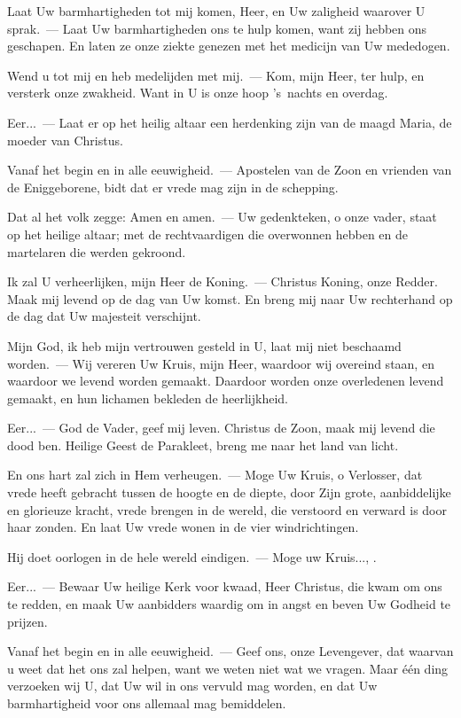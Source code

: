 \documentclass[12pt,twoside,a5paper]{article}
\begin{document}
\begin{halfparskip}
   Laat Uw barmhartigheden tot mij komen, Heer, en Uw zaligheid waarover U sprak.~--- Laat Uw barmhartigheden ons te hulp komen, want zij hebben ons geschapen. En laten ze onze ziekte genezen met het medicijn van Uw mededogen.

  Wend u tot mij en heb medelijden met mij.~--- Kom, mijn Heer, ter hulp, en versterk onze zwakheid. Want in U is onze hoop 's~nachts en overdag.

  Eer...~--- Laat er op het heilig altaar een herdenking zijn van de maagd Maria, de moeder van Christus.

  Vanaf het begin en in alle eeuwigheid.~--- Apostelen van de Zoon en vrienden van de Eniggeborene, bidt dat er vrede mag zijn in de schepping.

  Dat al het volk zegge: Amen en amen.~--- Uw gedenkteken, o onze vader, staat op het heilige altaar; met de rechtvaardigen die overwonnen hebben en de martelaren die werden gekroond.
\end{halfparskip}

\begin{halfparskip}
   Ik zal U verheerlijken, mijn Heer de Koning.~--- Christus Koning, onze Redder. Maak mij levend op de dag van Uw komst. En breng mij naar Uw rechterhand op de dag dat Uw majesteit verschijnt.

  Mijn God, ik heb mijn vertrouwen gesteld in U, laat mij niet beschaamd worden.~--- Wij vereren Uw Kruis, mijn Heer, waardoor wij overeind staan, en waardoor we levend worden gemaakt. Daardoor worden onze overledenen levend gemaakt, en hun lichamen bekleden de heerlijkheid.

  Eer...~--- God de Vader, geef mij leven. Christus de Zoon, maak mij levend die dood ben. Heilige Geest de Parakleet, breng me naar het land van licht.
\end{halfparskip}

\begin{halfparskip}
   En ons hart zal zich in Hem verheugen.~--- Moge Uw Kruis, o Verlosser, dat vrede heeft gebracht tussen de hoogte en de diepte, door Zijn grote, aanbiddelijke en glorieuze kracht, vrede brengen in de wereld, die verstoord en verward is door haar zonden. En laat Uw vrede wonen in de vier windrichtingen.

  Hij doet oorlogen in de hele wereld eindigen.~--- Moge uw Kruis..., .

  Eer...~--- Bewaar Uw heilige Kerk voor kwaad, Heer Christus, die kwam om ons te redden, en maak Uw aanbidders waardig om in angst en beven Uw Godheid te prijzen.

  Vanaf het begin en in alle eeuwigheid.~--- Geef ons, onze Levengever, dat waarvan u weet dat het ons zal helpen, want we weten niet wat we vragen. Maar één ding verzoeken wij U, dat Uw wil in ons vervuld mag worden, en dat Uw barmhartigheid voor ons allemaal mag bemiddelen.
\end{halfparskip}
\end{document}
